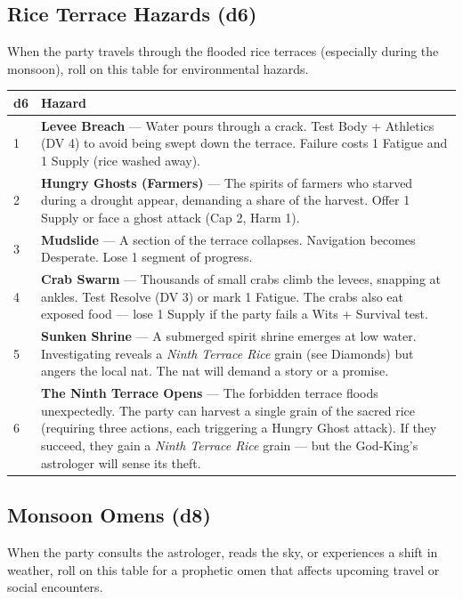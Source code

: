 \subsection*{Rice Terrace Hazards (d6)}
\label{sec:ayokha-rice-hazards}

When the party travels through the flooded rice terraces (especially during the monsoon), roll on this table for environmental hazards.

\begin{longtable}{|p{1.5cm}|p{10cm}|}
\hline
\rowcolor{gray!20}
\textbf{d6} & \textbf{Hazard} \\
\hline
1 & \textbf{Levee Breach} --- Water pours through a crack. Test Body + Athletics (DV 4) to avoid being swept down the terrace. Failure costs 1 Fatigue and 1 Supply (rice washed away). \\
\hline
2 & \textbf{Hungry Ghosts (Farmers)} --- The spirits of farmers who starved during a drought appear, demanding a share of the harvest. Offer 1 Supply or face a ghost attack (Cap 2, Harm 1). \\
\hline
3 & \textbf{Mudslide} --- A section of the terrace collapses. Navigation becomes Desperate. Lose 1 segment of progress. \\
\hline
4 & \textbf{Crab Swarm} --- Thousands of small crabs climb the levees, snapping at ankles. Test Resolve (DV 3) or mark 1 Fatigue. The crabs also eat exposed food --- lose 1 Supply if the party fails a Wits + Survival test. \\
\hline
5 & \textbf{Sunken Shrine} --- A submerged spirit shrine emerges at low water. Investigating reveals a \textit{Ninth Terrace Rice} grain (see Diamonds) but angers the local nat. The nat will demand a story or a promise. \\
\hline
6 & \textbf{The Ninth Terrace Opens} --- The forbidden terrace floods unexpectedly. The party can harvest a single grain of the sacred rice (requiring three actions, each triggering a Hungry Ghost attack). If they succeed, they gain a \textit{Ninth Terrace Rice} grain --- but the God-King's astrologer will sense its theft. \\
\hline
\end{longtable}

\subsection*{Monsoon Omens (d8)}
\label{sec:ayokha-monsoon-omens}

When the party consults the astrologer, reads the sky, or experiences a shift in weather, roll on this table for a prophetic omen that affects upcoming travel or social encounters.

